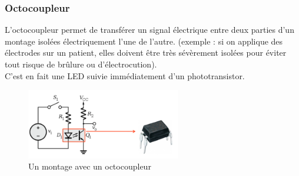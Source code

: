 \documentclass[a4paper]{article}
\begin{document}
    \subsubsection{Octocoupleur}
    L'octocoupleur permet de transférer un signal électrique entre deux parties
    d'un montage isolées électriquement l'une de l'autre. (exemple : si on 
    applique des électrodes sur un patient, elles doivent être très sévèrement
    isolées pour éviter tout risque de brûlure ou d'électrocution).\\

    C'est en fait une LED suivie immédiatement d'un phototransistor.
    \begin{figure}[H]
        \begin{center}
            \includegraphics[width=0.6\textwidth]{fig/5_octocoupleur.png}
            \caption{Un montage avec un octocoupleur}
            \label{fig:5_octocoupleur}
        \end{center}
    \end{figure}
\end{document}
